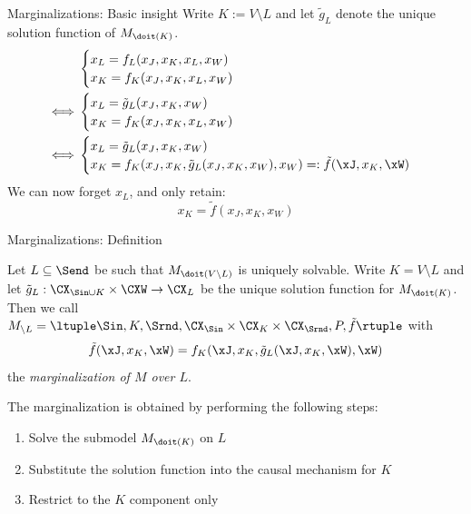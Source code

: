 \begin{frame}{Marginalizations: Basic insight}
  Write $K := V \setminus L$ and let $\tilde{g}_L$ denote the unique solution function of $M_{\doit(K)}$.
    \begin{equation*}\begin{split}
  & \begin{cases}
    x_L = f_L(x_J,x_K,x_L,x_W) \\
    x_K = f_K(x_J,x_K,x_L,x_W) \\
  \end{cases} \\
  \iff & \begin{cases}
    x_L = \tilde{g}_L(x_J,x_K,x_W) \\
    x_K = f_K(x_J,x_K,x_L,x_W) \\
  \end{cases}  \\
  \iff & \begin{cases}
    x_L = \tilde{g}_L(x_J,x_K,x_W) \\
    x_K = f_K(x_J,x_K,\tilde{g}_L(x_J,x_K,x_W),x_W) =: \tilde{f}(\xJ,x_{K},\xW) \\
  \end{cases} \\
  \end{split}\end{equation*}
  We can now forget $x_L$, and only retain:
  $$x_K = \tilde{f}(x_J,x_K,x_W)$$
\end{frame}

\begin{frame}{Marginalizations: Definition}
\begin{Def}
  Let $L \subseteq \Send$ be such that $M_{\doit(V\setminus L)}$ is uniquely solvable.
  Write $K = V \setminus L$ and let $\tilde{g}_L : \CX_{\Sin \cup K} \times \CXW \to \CX_L$
  be the unique solution function for $M_{\doit(K)}$.
  Then we call $M_{\setminus L} = \ltuple \Sin, K, \Srnd, \CX_{\Sin} \times \CX_{K} \times \CX_{\Srnd}, P, \tilde{f} \rtuple$ with
  $$\tilde{f}(\xJ,x_{K},\xW) = f_{K}(\xJ,x_{K},\tilde{g}_L(\xJ,x_{K},\xW),\xW)$$
  the \emph{marginalization of $M$ over $L$}.
\end{Def}
The marginalization is obtained by performing the following steps:
  \begin{enumerate}
    \item Solve the submodel $M_{\doit(K)}$ on $L$
    \item Substitute the solution function into the causal mechanism for $K$
    \item Restrict to the $K$ component only
  \end{enumerate}
\end{frame}

